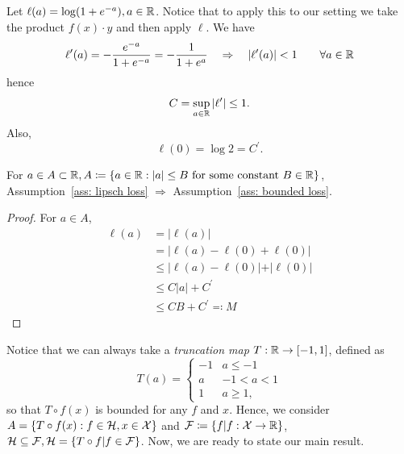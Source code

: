 \documentclass[reqno]{amsart}
\begin{document}
\begin{example}\label{ex: logistic}
    Let $\ell (a) = \log (1+e^{-a}), a \in \mathbb{R}$. Notice that to apply this to our setting we take the product $f(x)\cdot y$ and then apply $\ell$.
    We have
    \[
    \ell'(a) = -\frac{e^{-a}}{1+e^{-a}} = -\frac{1}{1+e^a}\quad \Rightarrow \quad \vert \ell'(a)\vert < 1 \qquad\forall a \in \mathbb{R}
    \]
    hence 
    \[
    C = \sup_{a\in\mathbb{R}} \vert \ell^\prime\vert \le 1.
    \]
    Also,
    \[
    \ell(0) = \log 2 = C^\prime.
    \]
\end{example}

\begin{proposition}\label{prop: suff assump 2.2}
    For $a\in A\subset\mathbb{R}, A\coloneqq \{a\in\mathbb{R} : \vert a \vert \le B\text{ for some constant } B \in \mathbb{R}\}$, Assumption~\ref{ass: lipsch loss} $\Rightarrow$ Assumption~\ref{ass: bounded loss}. 
    \begin{proof} For $a\in A$,
        \begin{align*}
            \ell(a) &= \vert \ell(a)\vert \\
            &= \vert \ell(a)-\ell(0)+\ell(0)\vert \\
            &\le \vert \ell(a)-\ell(0)\vert + \vert \ell(0)\vert \\
            &\le C\vert a \vert + C^\prime \\
            &\le CB + C^\prime \eqqcolon M
        \end{align*}
    \end{proof} 
\end{proposition}
Notice that we can always take a {\it\/truncation map} $T:\mathbb{R}\to[-1,1]$, defined as 
\begin{equation}
    T(a) = \begin{cases}
        -1 & a \le -1\\
        a & -1<a<1\\
        1 & a\ge 1,
    \end{cases}
\end{equation}
so that $T\circ f(x)$ is bounded for any $f$ and $x$. Hence, we consider $A = \{T\circ f(x) : f \in\mathcal{H}, x\in\mathcal{X}\}$ and $\mathcal{F}\coloneq\{f \vert f:\mathcal{X} \to \mathbb{R}\}$, $\mathcal{H} \subseteq \mathcal{F}, \mathcal{H} = \{T\circ f \vert f \in \mathcal{F}\}$. Now, we are ready to state our main result. 
\end{document}
